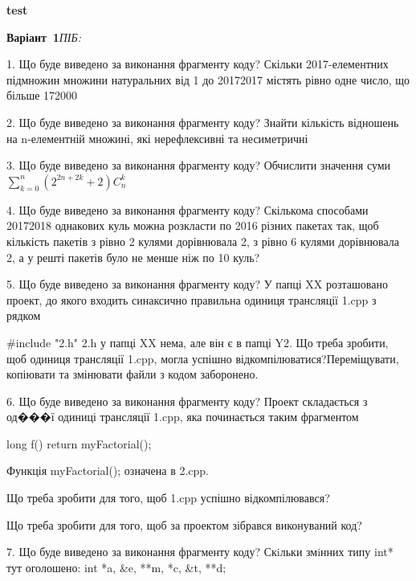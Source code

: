 \documentclass[11pt]{article}
\begin{document}
{\large\textbf{test}}

\textbf{Варіант \No\,1}\hfill \textit{ПІБ:}\,\underline{\hspace{60mm}}
\vspace{4mm}

1. Що буде виведено за виконання фрагменту коду?
Скільки 2017-елементних підмножин множини натуральних від 1 до 20172017 містять рівно одне число, що більше 172000

2. Що буде виведено за виконання фрагменту коду?
Знайти кількість відношень на n-елементній множині, які нерефлексивні та несиметричні

3. Що буде виведено за виконання фрагменту коду?
Обчислити значення суми {$\sum\limits_{k=0}^{n} \left({{2^{2n+2k}}+2}\right){C_n^k}$}

4. Що буде виведено за виконання фрагменту коду?
Скількома способами 20172018 однакових куль можна розкласти по 2016 різних пакетах так, щоб кількість пакетів з рівно 2 кулями дорівнювала 2, з рівно 6 кулями дорівнювала 2, а у решті пакетів було не менше ніж по 10 куль?

5. Що буде виведено за виконання фрагменту коду?
У папці XX розташовано проект, до якого входить синаксично правильна одиниця трансляції 1.cpp з рядком\par
{\#}include "2.h"
 2.h у папці XX нема, але він є в папці Y2. Що треба зробити, щоб одиниця трансляції 1.cpp, могла успішно відкомпілюватися?Переміщувати, копіювати та змінювати файли з кодом заборонено.\par\vspace{1.5cm}

6. Що буде виведено за виконання фрагменту коду?
Проект складається з од���ї одиниці трансляції 1.cpp, яка починається таким фрагментом\par
long f(){ return myFactorial();}\par
Функція myFactorial(); означена в 2.cpp.\par
Що треба зробити для того, щоб 1.cpp успішно відкомпілювався?\par\vspace{1.5cm}
Що треба зробити для того, щоб за проектом зібрався виконуваний код?\par


7. Що буде виведено за виконання фрагменту коду?
Скiльки змiнних типу int* тут оголошено: int *a, &e, **m, *c, &t, **d;
\end{document}
